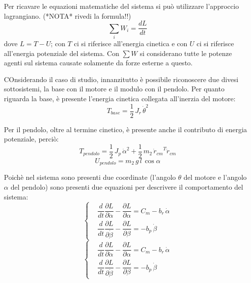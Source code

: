\documentclass[11pt]{article}
\begin{document}
Per ricavare le equazioni matematiche del sistema si può utilizzare l'approccio lagrangiano. (*NOTA* rivedi la formula!!)
\begin{equation}
	\sum_{i}^{} W_i = \dfrac{dL}{dt}
\end{equation}
dove $L = T - U$; con $T$ ci si riferisce all'energia cinetica e con $U$ ci si riferisce all'energia potenziale del sistema. Con $\sum W$ si considerano tutte le potenze agenti sul sistema causate solamente da forze esterne a questo. 


COnsiderando il caso di studio, innanzitutto è possibile riconoscere due divesi sottosistemi, la base con il motore e il modulo con il pendolo.
Per quanto riguarda la base, è presente l'energia cinetica collegata all'inerzia del motore:
\begin{equation}
    T_{base} = \dfrac{1}{2} \, J_r \, \dot{\theta}^2
\end{equation}

Per il pendolo, oltre al termine cinetico, è presente anche il contributo di energia potenziale, perciò:
\begin{equation}
    T_{pendolo} = \dfrac{1}{2} \, J_p \, \dot{\alpha}^2 + \dfrac{1}{2} \, m_2 \, {\dot{r}_{cm}}^T\dot{r}_{cm}
\end{equation}
\begin{equation}
    U_{pendolo} = m_2 \, g\, l\, \cos\alpha
\end{equation}

Poichè nel sistema sono presenti due coordinate (l'angolo $\theta$ del motore e l'angolo $\alpha$ del pendolo) sono presenti due equazioni per descrivere il comportamento del sistema:
\begin{equation}
	\left\{
	\begin{aligned}
		&\dfrac{d}{dt}\dfrac{\partial L}{\partial \dot{\alpha}} - \dfrac{\partial L}{\partial \alpha} = C_m - b_r \, \dot{\alpha} \\
		&\dfrac{d}{dt}\dfrac{\partial L}{\partial \dot{\beta}} - \dfrac{\partial L}{\partial \beta} = - b_p \, \dot{\beta}
	\end{aligned}
	\right.
\end{equation}
\begin{equation}
	\left\{
	\begin{aligned}
		&\dfrac{d}{dt}\dfrac{\partial L}{\partial \dot{\alpha}} - \dfrac{\partial L}{\partial \alpha} = C_m - b_r \, \dot{\alpha} \\
		&\dfrac{d}{dt}\dfrac{\partial L}{\partial \dot{\beta}} - \dfrac{\partial L}{\partial \beta} = - b_p \, \dot{\beta}
	\end{aligned}
	\right.
\end{equation}
\end{document}
